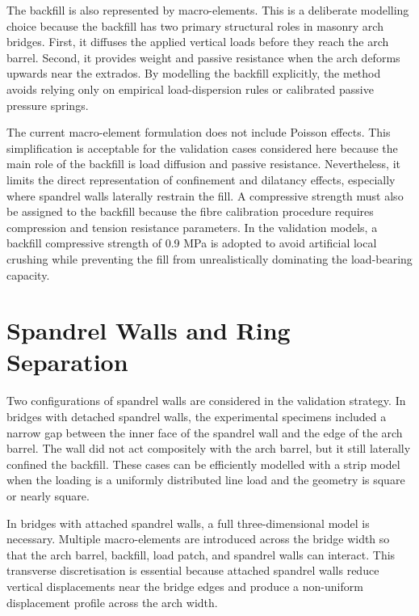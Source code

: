 The backfill is also represented by macro-elements. This is a deliberate modelling choice because the backfill has two primary structural roles in masonry arch bridges. First, it diffuses the applied vertical loads before they reach the arch barrel. Second, it provides weight and passive resistance when the arch deforms upwards near the extrados. By modelling the backfill explicitly, the method avoids relying only on empirical load-dispersion rules or calibrated passive pressure springs.

The current macro-element formulation does not include Poisson effects. This simplification is acceptable for the validation cases considered here because the main role of the backfill is load diffusion and passive resistance. Nevertheless, it limits the direct representation of confinement and dilatancy effects, especially where spandrel walls laterally restrain the fill. A compressive strength must also be assigned to the backfill because the fibre calibration procedure requires compression and tension resistance parameters. In the validation models, a backfill compressive strength of 0.9 MPa is adopted to avoid artificial local crushing while preventing the fill from unrealistically dominating the load-bearing capacity.

\section{Spandrel Walls and Ring Separation}
\label{sec:dmem-spandrels-rings}

Two configurations of spandrel walls are considered in the validation strategy. In bridges with detached spandrel walls, the experimental specimens included a narrow gap between the inner face of the spandrel wall and the edge of the arch barrel. The wall did not act compositely with the arch barrel, but it still laterally confined the backfill. These cases can be efficiently modelled with a strip model when the loading is a uniformly distributed line load and the geometry is square or nearly square.

In bridges with attached spandrel walls, a full three-dimensional model is necessary. Multiple macro-elements are introduced across the bridge width so that the arch barrel, backfill, load patch, and spandrel walls can interact. This transverse discretisation is essential because attached spandrel walls reduce vertical displacements near the bridge edges and produce a non-uniform displacement profile across the arch width.


